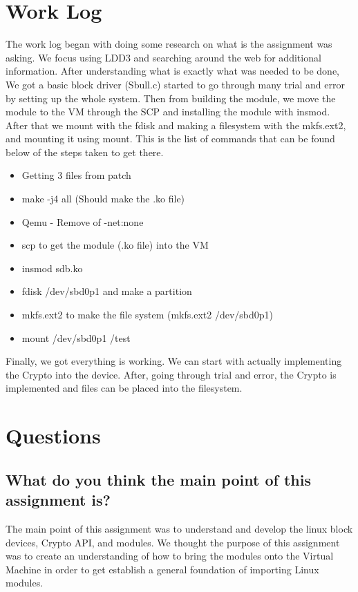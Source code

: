 \documentclass[onecolumn, draftclsnofoot, 10pt, titlepage, compsoc]{IEEEtran}
\begin{document}
\section{Work Log}
The work log began with doing some research on what is the assignment was asking. We focus using LDD3 and searching around the web for additional information. After understanding what is exactly what was needed to be done, We got a basic block driver (Sbull.c) started to go through many trial and error by setting up the whole system. Then from building the module, we move the module to the VM through the SCP and installing the module with insmod. After that we mount with the fdisk and making a filesystem with the mkfs.ext2, and mounting it using mount. This is the list of commands that can be found below of the steps taken to get there.\\

\begin{itemize}
\item Getting 3 files from patch
\item make -j4 all (Should make the .ko file)
\item Qemu - Remove of -net:none
\item scp to get the module (.ko file) into the VM
\item insmod sdb.ko
\item fdisk /dev/sbd0p1 and make a partition
\item mkfs.ext2 to make the file system (mkfs.ext2 /dev/sbd0p1)
\item mount /dev/sbd0p1 /test
\end{itemize}

Finally, we got everything is working. We can start with actually implementing the Crypto into the device.  After, going through trial and error, the Crypto is implemented and files can be placed into the filesystem.\\

\section{Questions}

\subsection{What do you think the main point of this assignment is?}

The main point of this assignment was to understand and develop the linux block devices, Crypto API, and modules. We thought the purpose of this assignment was to create an understanding of how to bring the modules onto the Virtual Machine in order to get establish a general foundation of importing Linux modules.\\
\end{document}
